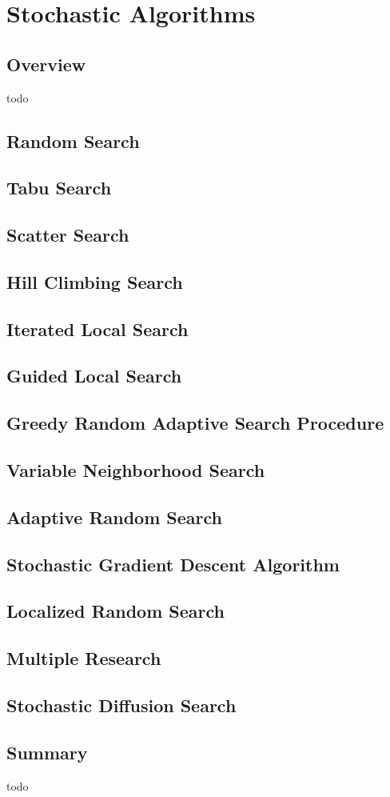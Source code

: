 \chapter{Stochastic Algorithms}
\label{ch:stochastic}

\section{Overview}
todo


\section{Random Search}
\section{Tabu Search}
\section{Scatter Search}
\section{Hill Climbing Search}
\section{Iterated Local Search}
\section{Guided Local Search}
\section{Greedy Random Adaptive Search Procedure}
\section{Variable Neighborhood Search}
\section{Adaptive Random Search}
\section{Stochastic Gradient Descent Algorithm}

\section{Localized Random Search}
\section{Multiple Research}
\section{Stochastic Diffusion Search}


\section{Summary}
todo
